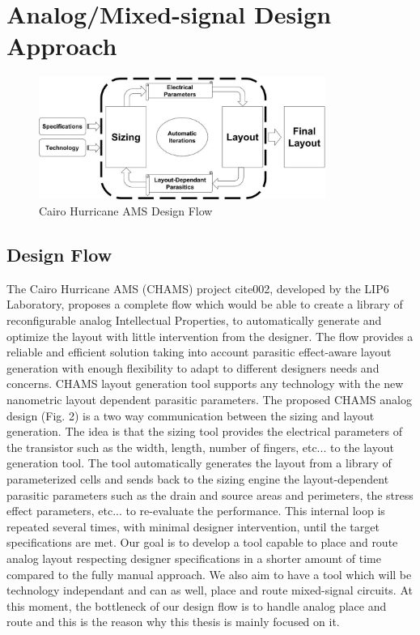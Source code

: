 \chapter{Analog/Mixed-signal Design Approach}
\begin{figure}[h]
\begin{center}
\includegraphics[height=40mm]{Figures/3.jpg}
\caption{Cairo Hurricane AMS Design Flow}
\end{center}
\end{figure}
\vspace{-1.5cm}
\section{Design Flow}
The Cairo Hurricane AMS (CHAMS) project cite{002}, developed by the LIP6 Laboratory, proposes a complete flow which would be able to create a library of reconfigurable analog Intellectual Properties, to automatically generate and optimize the layout with little intervention from the designer. The flow provides a reliable and efficient solution taking into account parasitic effect-aware layout generation with enough flexibility to adapt to different designers needs and concerns. CHAMS layout generation tool supports any technology with the new nanometric layout dependent parasitic parameters.
\newline 
\newline 
\indent The proposed CHAMS analog design (Fig. 2) is a two way communication between the sizing and layout generation. The idea is that the sizing tool provides the electrical parameters of the transistor such as the width, length, number of fingers, etc... to the layout generation tool. The tool automatically generates the layout from a library of parameterized cells and sends back to the sizing engine the layout-dependent parasitic parameters such as the drain and source areas and perimeters, the stress effect parameters, etc... to re-evaluate the performance. This internal loop is repeated several times, with minimal designer intervention, until the target specifications are met.
\newline 
\newline 
\indent Our goal is to develop a tool capable to place and route analog layout respecting designer specifications in a shorter amount of time compared to the fully manual approach. We also aim to have a tool which will be technology independant and can as well, place  and route mixed-signal circuits. At this moment, the bottleneck of our design flow is to handle analog place and route and this is the reason why this thesis is mainly focused on it.
 
